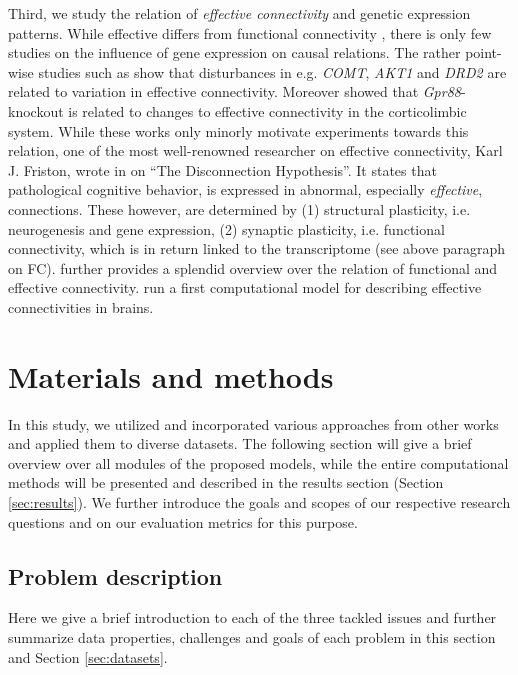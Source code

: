 \documentclass[]{article}
\renewcommand{\cite}{\citep}
\begin{document}
Third, we study the relation of \textit{effective connectivity} and genetic expression patterns. While effective differs from functional connectivity \cite{bauer2018effective}, there is only few studies on the influence of gene expression on causal relations. The rather point-wise studies such as \citet{tan2012effective} show that disturbances in e.g. \textit{COMT}, \textit{AKT1} and \textit{DRD2} are related to variation in effective connectivity. Moreover \citet{hamida2018increased} showed that \textit{Gpr88}-knockout is related to changes to effective connectivity in the corticolimbic system. While these works only minorly motivate experiments towards this relation, one of the most well-renowned researcher on effective connectivity, Karl J. Friston, wrote in \citet{friston2002dysfunctional} on ``The Disconnection Hypothesis''. It states that pathological cognitive behavior, is expressed in abnormal, especially \textit{effective}, connections. These however, are determined by (1) structural plasticity, i.e. neurogenesis and gene expression, (2) synaptic plasticity, i.e. functional connectivity, which is in return linked to the transcriptome (see above paragraph on FC). \citet{friston2011functional} further provides a splendid overview over the relation of functional and effective connectivity. \citet{lepperod2018inferring} run a first computational model for describing effective connectivities in brains.


\newpage
\section{Materials and methods}
\label{sec:methods}
In this study, we utilized and incorporated various approaches from other works and applied them to diverse datasets. The following section will give a brief overview over all modules of the proposed models, while the entire computational methods will be presented and described in the results section (Section \ref{sec:results}). We further introduce the goals and scopes of our respective research questions and on our evaluation metrics for this purpose.  

\subsection{Problem description}
\label{sec:probdesc}
Here we give a brief introduction to each of the three tackled issues and further summarize data properties, challenges and goals of each problem in this section and Section \ref{sec:datasets}. 
\end{document}

